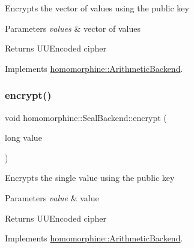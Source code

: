 Encrypts the vector of values using the public key


\begin{DoxyParams}{Parameters}
{\em values} & vector of values \\
\hline
\end{DoxyParams}
\begin{DoxyReturn}{Returns}
U\+U\+Encoded cipher 
\end{DoxyReturn}


Implements \hyperlink{classhomomorphine_1_1_arithmetic_backend_a684c16673191eb5f7c6400f3d34cbcc1}{homomorphine\+::\+Arithmetic\+Backend}.

\mbox{\label{classhomomorphine_1_1_seal_backend_aa0815bdb369e3802140efc722a811112}} 
\subsubsection{\texorpdfstring{encrypt()}{encrypt()}\hspace{0.1cm}{\footnotesize\ttfamily [2/2]}}
{\footnotesize\ttfamily void homomorphine\+::\+Seal\+Backend\+::encrypt (\begin{DoxyParamCaption}\item[{long}]{value }\end{DoxyParamCaption})\hspace{0.3cm}{\ttfamily [virtual]}}

Encrypts the single value using the public key


\begin{DoxyParams}{Parameters}
{\em value} & value \\
\hline
\end{DoxyParams}
\begin{DoxyReturn}{Returns}
U\+U\+Encoded cipher 
\end{DoxyReturn}


Implements \hyperlink{classhomomorphine_1_1_arithmetic_backend_abdf6100f3d87580c942526027823fdb1}{homomorphine\+::\+Arithmetic\+Backend}.

\mbox{\label{classhomomorphine_1_1_seal_backend_a1e2ed46b896d4a5b5d930ec7bcd3207b}} 
